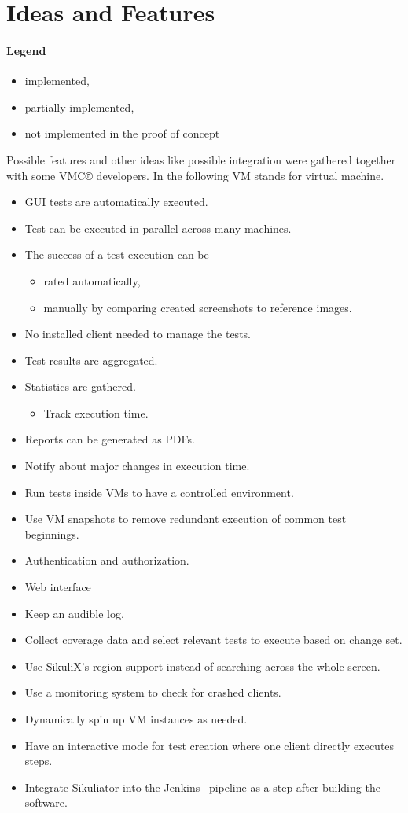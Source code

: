 \documentclass[a4paper,twocolumn,twoside]{article}
\newcommand{\VMC}[0]{VMC®}
\newcommand{\Sik}[0]{Sikuliator}
\newcommand{\notImplemented}[0]{\item[$\times$] }
\newcommand{\partiallyImplemented}[0]{\item[$\boxdot$] }
\newcommand{\implemented}[0]{\item[\checkmark] }
\begin{document}
\section{Ideas and Features}
\paragraph{Legend}
\begin{itemize}
	\implemented implemented,
	\partiallyImplemented partially implemented,
	\notImplemented not implemented in the proof of concept
\end{itemize}
	
	Possible features and other ideas like possible integration were gathered together with some \VMC{} developers.
	In the following VM stands for virtual machine.
	
\begin{itemize}
	\implemented GUI tests are automatically executed.
	\implemented Test can be executed in parallel across many machines.
	\partiallyImplemented The success of a test execution can be
	\begin{itemize}
		\implemented rated automatically,
		\notImplemented manually by comparing created screenshots to reference images.
	\end{itemize}
	\implemented No installed client needed to manage the tests.
	\implemented Test results are aggregated.
	\partiallyImplemented Statistics are gathered.
	\begin{itemize}
		\implemented Track execution time.
	\end{itemize}
	\notImplemented Reports can be generated as PDFs.
	\notImplemented Notify about major changes in execution time.
	\implemented Run tests inside VMs to have a controlled environment.
	\notImplemented Use VM snapshots to remove redundant execution of common test beginnings.
	\notImplemented Authentication and authorization.
	\partiallyImplemented Web interface
	\notImplemented Keep an audible log.
	\notImplemented Collect coverage data and select relevant tests to execute based on change set.
	\notImplemented Use SikuliX's region support instead of searching across the whole screen.
	\notImplemented Use a monitoring system to check for crashed clients.
	\notImplemented Dynamically spin up VM instances as needed.
	\notImplemented Have an interactive mode for test creation where one client directly executes steps.
	\notImplemented Integrate \Sik{} into the Jenkins~\cite{Jenkins} pipeline as a step after building the software.
\end{itemize}
\end{document}
